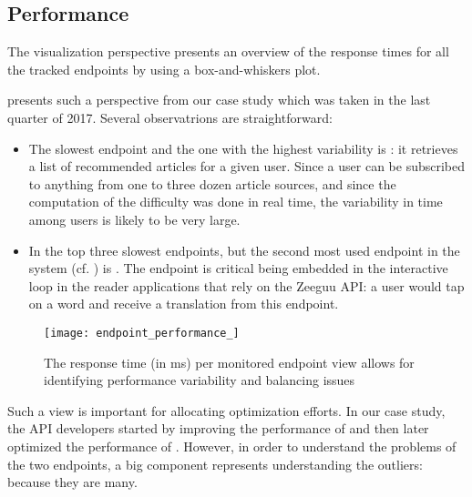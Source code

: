 
\subsection{Performance}
\label{sec:perf}

The  visualization perspective presents
an overview of the response times for all the tracked endpoints 
by using a box-and-whiskers plot. 

 presents such a perspective from our case study which 
was taken in the last quarter of 2017. Several observatrions are 
straightforward: 

\begin{itemize}

  \item The slowest endpoint and the one with the highest variability is \epFeedItemsColor: it retrieves a list of recommended articles for a given user. Since a user can be subscribed to anything from one to three dozen article sources, and since the computation of the difficulty was done in real time, the variability in time among users is likely to be very large. 

  \item In the top three slowest endpoints, but the second most used endpoint in the system (cf. ) is \epTranslationsColor. The endpoint is critical being embedded in the interactive loop in the reader applications that rely on the Zeeguu API: a user would tap on a word and receive a translation from this endpoint.
 
\end{itemize}

\begin{figure}[!ht]
 \centering
 \texttt{[image: endpoint\_performance\_]}
 \caption{The response time (in ms) per monitored endpoint view allows for identifying performance variability and balancing issues}
 \label{fig:ep}
\end{figure}

Such a view is important for allocating optimization efforts. In our case study, the API developers started by improving the performance of \epTranslationsColor and then later optimized the performance of \epFeedItemsColor. However, in order to understand the problems of the two endpoints, a big component represents understanding the outliers: because they are many. 


